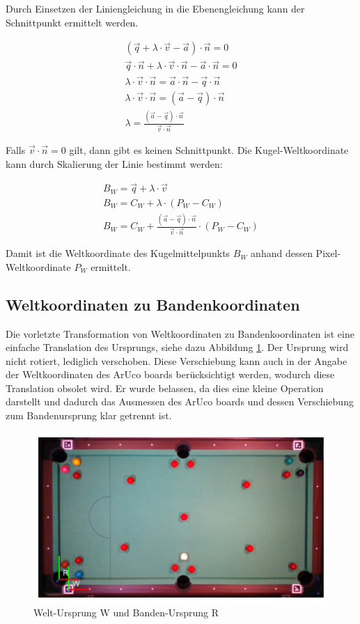 Durch Einsetzen der Liniengleichung in die Ebenengleichung kann der Schnittpunkt ermittelt werden.

\begin{align}
(\vec{q} + \lambda \cdot \vec{v} - \vec{a}) \cdot \vec{n} = 0\\
\vec{q} \cdot \vec{n} + \lambda \cdot \vec{v} \cdot \vec{n} - \vec{a} \cdot \vec{n} = 0\\
\lambda \cdot \vec{v} \cdot \vec{n} = \vec{a} \cdot \vec{n} - \vec{q} \cdot \vec{n}\\
\lambda \cdot \vec{v} \cdot \vec{n} = (\vec{a} - \vec{q}) \cdot \vec{n}\\
\lambda = \frac{(\vec{a} - \vec{q}) \cdot \vec{n}}{\vec{v} \cdot \vec{n}}
\end{align}

Falls $\vec{v} \cdot \vec{n} = 0$ gilt, dann gibt es keinen Schnittpunkt.
Die Kugel-Weltkoordinate kann durch Skalierung der Linie bestimmt werden:

\begin{align}
B_W = \vec{q} + \lambda \cdot \vec{v}\\
B_W = C_W + \lambda \cdot (P_W - C_W)\\
B_W = C_W + \frac{(\vec{a} - \vec{q}) \cdot \vec{n}}{\vec{v} \cdot \vec{n}} \cdot (P_W - C_W)
\end{align}

Damit ist die Weltkoordinate des Kugelmittelpunkts $B_W$ anhand dessen Pixel-Weltkoordinate $P_W$ ermittelt.


\subsection{Weltkoordinaten zu Bandenkoordinaten}\label{kap:world_to_rail}

Die vorletzte Transformation von Weltkoordinaten zu Bandenkoordinaten ist eine einfache Translation des Ursprungs,
siehe dazu Abbildung \ref{fig:table_world_to_rail}. Der Ursprung wird nicht rotiert, lediglich verschoben.
Diese Verschiebung kann auch in der Angabe der Weltkoordinaten des ArUco boards berücksichtigt werden, wodurch diese
Translation obsolet wird. Er wurde belassen, da dies eine kleine Operation darstellt und dadurch das Ausmessen des
ArUco boards und dessen Verschiebung zum Bandenursprung klar getrennt ist.

\begin{figure}[h!]
    \begin{center}
    \includegraphics[width=0.6\linewidth]{../common/resources/coordinate_systems/table_world_to_rail.png}
    \end{center}
    \caption{Welt-Ursprung W und Banden-Ursprung R}
    \label{fig:table_world_to_rail}
\end{figure}


